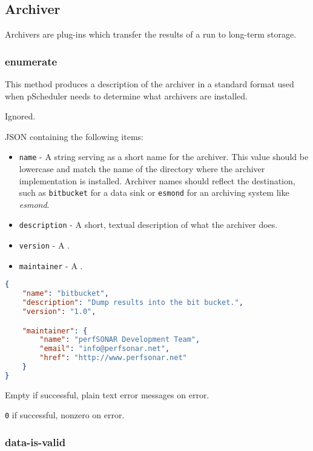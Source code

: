 \documentclass[10pt,titlepage]{article}
\begin{document}
\subsection{Archiver}
Archivers are plug-ins which transfer the results of a run to
long-term storage.



\subsubsection{enumerate}

This method produces a description of the archiver in a standard
format used when pScheduler needs to determine what archivers are
installed.

 Ignored.

 JSON containing the following items:
\begin{itemize}
\item{\tt name} - A string serving as a short name for the archiver.
  This value should be lowercase and match the name of the directory
  where the archiver implementation is installed.  Archiver names
  should reflect the destination, such as {\tt bitbucket} for a data
  sink or {\tt esmond} for an archiving system like {\it esmond}.
\item{\tt description} - A short, textual description of what the
  archiver does.
\item{\tt version} - A .
\item{\tt maintainer} - A .
\end{itemize}

\example
\begin{lstlisting}[language=json,firstnumber=1]
{
    "name": "bitbucket",
    "description": "Dump results into the bit bucket.",
    "version": "1.0",

    "maintainer": {
        "name": "perfSONAR Development Team",
        "email": "info@perfsonar.net",
        "href": "http://www.perfsonar.net"
    }
}
\end{lstlisting}

 Empty if successful, plain text error
messages on error.

 {\tt 0} if successful, nonzero on error.



\subsubsection{data-is-valid}
\end{document}
